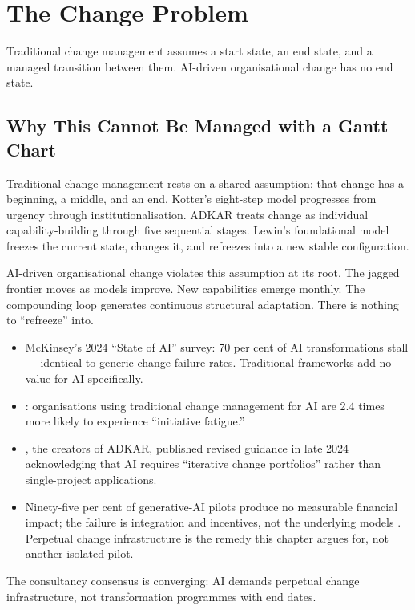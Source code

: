 \chapter{The Change Problem}
\label{ch:change-problem}

\epigraph{Traditional change management assumes a start state, an end state, and a managed transition between them. AI-driven organisational change has no end state.}{}

\section{Why This Cannot Be Managed with a Gantt Chart}

Traditional change management rests on a shared assumption: that change has a beginning, a middle, and an end. Kotter's eight-step model progresses from urgency through institutionalisation. ADKAR treats change as individual capability-building through five sequential stages. Lewin's foundational model freezes the current state, changes it, and refreezes into a new stable configuration.

AI-driven organisational change violates this assumption at its root. The jagged frontier moves as models improve. New capabilities emerge monthly. The compounding loop generates continuous structural adaptation. There is nothing to ``refreeze'' into.

\begin{evidencebox}[title={Evidence for Framework Failure}]
\begin{itemize}
  \item McKinsey's 2024 ``State of AI'' survey: 70 per cent of AI transformations stall --- identical to generic change failure rates. Traditional frameworks add no value for AI specifically.
  \item \textcite{Gartner2025}: organisations using traditional change management for AI are 2.4 times more likely to experience ``initiative fatigue.''
  \item \textcite{Prosci2024}, the creators of ADKAR, published revised guidance in late 2024 acknowledging that AI requires ``iterative change portfolios'' rather than single-project applications.
  \item Ninety-five per cent of generative-AI pilots produce no measurable financial impact; the failure is integration and incentives, not the underlying models \parencite{MITNANDA2025}. Perpetual change infrastructure is the remedy this chapter argues for, not another isolated pilot.
\end{itemize}
The consultancy consensus is converging: AI demands perpetual change infrastructure, not transformation programmes with end dates.
\end{evidencebox}

